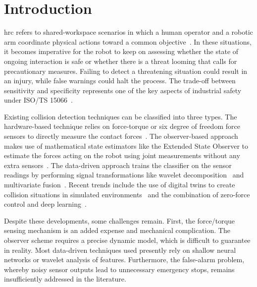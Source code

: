 \documentclass[3p,times,procedia]{elsarticle}
\begin{document}
\newpage

\section{Introduction}
\label{sec:introduction}

\Ac{hrc} refers to shared-workspace scenarios in which a human operator and a robotic arm coordinate physical actions toward a common objective~\cite{selvaggio2021autonomy}. In these situations, it becomes imperative for the robot to keep on assessing whether the state of ongoing interaction is safe or whether there is a threat looming that calls for precautionary measures. Failing to detect a threatening situation could result in an injury, while false warnings could halt the process. The trade-off between sensitivity and specificity represents one of the key aspects of industrial safety under ISO/TS 15066~\cite{iso15066}.

Existing collision detection techniques can be classified into three types. The hardware-based technique relies on force-torque or six degree of freedom force sensors to directly measure the contact forces~\cite{wang2025sixdof}. The observer-based approach makes use of mathematical state estimators like the Extended State Observer to estimate the forces acting on the robot using joint measurements without any extra sensors~\cite{tonti2024eso}. The data-driven approach trains the classifier on the sensor readings by performing signal transformations like wavelet decomposition~\cite{niu2024wavelet} and multivariate fusion~\cite{fang2024multivariate}. Recent trends include the use of digital twins to create collision situations in simulated environments~\cite{an2024digitaltwin} and the combination of zero-force control and deep learning~\cite{zhao2025zeroforce}.

Despite these developments, some challenges remain. First, the force/torque sensing mechanism is an added expense and mechanical complication. The observer scheme requires a precise dynamic model, which is difficult to guarantee in reality. Most data-driven techniques used presently rely on shallow neural networks or wavelet analysis of features. Furthermore, the false-alarm problem, whereby noisy sensor outputs lead to unnecessary emergency stops, remains insufficiently addressed in the literature.
\end{document}

